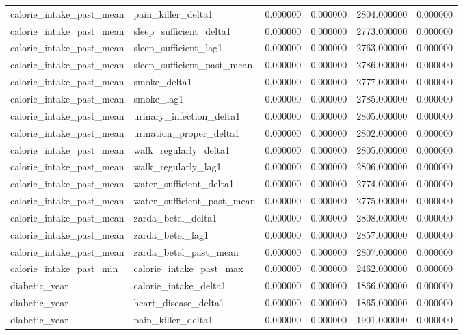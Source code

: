 \begin{longtable}{llrrrr}
calorie\_intake\_past\_mean & pain\_killer\_delta1 & 0.000000 & 0.000000 & 2804.000000 & 0.000000 \\
calorie\_intake\_past\_mean & sleep\_sufficient\_delta1 & 0.000000 & 0.000000 & 2773.000000 & 0.000000 \\
calorie\_intake\_past\_mean & sleep\_sufficient\_lag1 & 0.000000 & 0.000000 & 2763.000000 & 0.000000 \\
calorie\_intake\_past\_mean & sleep\_sufficient\_past\_mean & 0.000000 & 0.000000 & 2786.000000 & 0.000000 \\
calorie\_intake\_past\_mean & smoke\_delta1 & 0.000000 & 0.000000 & 2777.000000 & 0.000000 \\
calorie\_intake\_past\_mean & smoke\_lag1 & 0.000000 & 0.000000 & 2785.000000 & 0.000000 \\
calorie\_intake\_past\_mean & urinary\_infection\_delta1 & 0.000000 & 0.000000 & 2805.000000 & 0.000000 \\
calorie\_intake\_past\_mean & urination\_proper\_delta1 & 0.000000 & 0.000000 & 2802.000000 & 0.000000 \\
calorie\_intake\_past\_mean & walk\_regularly\_delta1 & 0.000000 & 0.000000 & 2805.000000 & 0.000000 \\
calorie\_intake\_past\_mean & walk\_regularly\_lag1 & 0.000000 & 0.000000 & 2806.000000 & 0.000000 \\
calorie\_intake\_past\_mean & water\_sufficient\_delta1 & 0.000000 & 0.000000 & 2774.000000 & 0.000000 \\
calorie\_intake\_past\_mean & water\_sufficient\_past\_mean & 0.000000 & 0.000000 & 2775.000000 & 0.000000 \\
calorie\_intake\_past\_mean & zarda\_betel\_delta1 & 0.000000 & 0.000000 & 2808.000000 & 0.000000 \\
calorie\_intake\_past\_mean & zarda\_betel\_lag1 & 0.000000 & 0.000000 & 2857.000000 & 0.000000 \\
calorie\_intake\_past\_mean & zarda\_betel\_past\_mean & 0.000000 & 0.000000 & 2807.000000 & 0.000000 \\
calorie\_intake\_past\_min & calorie\_intake\_past\_max & 0.000000 & 0.000000 & 2462.000000 & 0.000000 \\
diabetic\_year & calorie\_intake\_delta1 & 0.000000 & 0.000000 & 1866.000000 & 0.000000 \\
diabetic\_year & heart\_disease\_delta1 & 0.000000 & 0.000000 & 1865.000000 & 0.000000 \\
diabetic\_year & pain\_killer\_delta1 & 0.000000 & 0.000000 & 1901.000000 & 0.000000 \\

\end{longtable}
